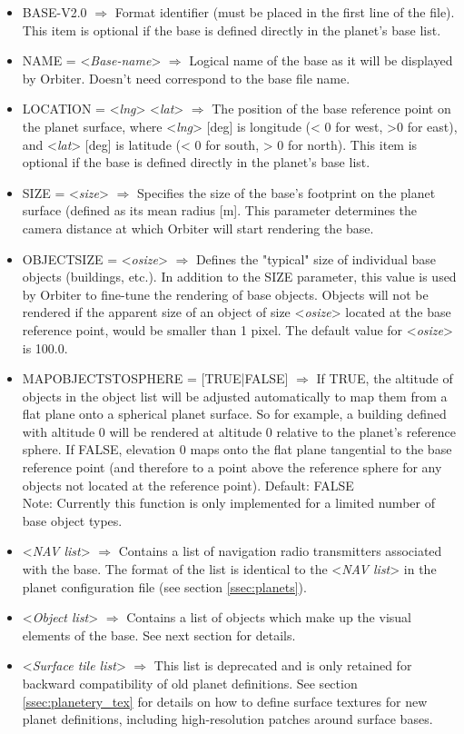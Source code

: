 \documentclass[Orbiter Developer Manual.tex]{subfiles}
\begin{document}
\begin{itemize}
\item BASE-V2.0 $\Rightarrow$ Format identifier (must be placed in the first line of the file). This item is optional if the base is defined directly in the planet’s base list.
\item NAME = <\textit{Base-name}> $\Rightarrow$ Logical name of the base as it will be displayed by Orbiter. Doesn’t need correspond to the base file name.
\item LOCATION = <\textit{lng}> <\textit{lat}> $\Rightarrow$ The position of the base reference point on the planet surface, where <\textit{lng}> [deg] is longitude (< 0 for west, >0 for east), and <\textit{lat}> [deg] is latitude (< 0 for south, > 0 for north). This item is optional if the base is defined directly in the planet’s base list.
\item SIZE = <\textit{size}> $\Rightarrow$ Specifies the size of the base’s footprint on the planet surface (defined as its mean radius [m]. This parameter determines the camera distance at which Orbiter will start rendering the base.
\item OBJECTSIZE = <\textit{osize}> $\Rightarrow$ Defines the "typical" size of individual base objects (buildings, etc.). In addition to the SIZE parameter, this value is used by Orbiter to fine-tune the rendering of base objects. Objects will not be rendered if the apparent size of an object of size <\textit{osize}> located at the base reference point, would be smaller than 1 pixel. The default value for <\textit{osize}> is 100.0.
\item MAPOBJECTSTOSPHERE = [TRUE|FALSE] $\Rightarrow$ If TRUE, the altitude of objects in the object list will be adjusted automatically to map them from a flat plane onto a spherical planet surface. So for example, a building defined with altitude 0 will be rendered at altitude 0 relative to the planet’s reference sphere. If FALSE, elevation 0 maps onto the flat plane tangential to the base reference point (and therefore to a point above the reference sphere for any objects not located at the reference point). Default: FALSE\\
Note: Currently this function is only implemented for a limited number of base object types.
\item <\textit{NAV list}> $\Rightarrow$ Contains a list of navigation radio transmitters associated with the base. The format of the list is identical to the <\textit{NAV list}> in the planet configuration file (see section \ref{ssec:planets}).
\item <\textit{Object list}> $\Rightarrow$ Contains a list of objects which make up the visual elements of the base. See next section for details.
\item <\textit{Surface tile list}> $\Rightarrow$ This list is deprecated and is only retained for backward compatibility of old planet definitions. See section \ref{ssec:planetery_tex} for details on how to define surface textures for new planet definitions, including high-resolution patches around surface bases.
\end{itemize}
\end{document}
